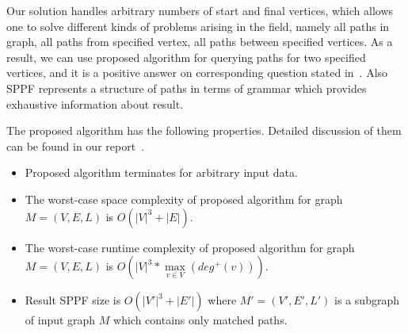 %

Our solution handles arbitrary numbers of start and final vertices, which allows one to solve different kinds of problems arising in the field, namely all paths in graph, all paths from specified vertex, all paths between specified vertices. As a result, we can use proposed algorithm for querying paths for two specified vertices, and it is a positive answer on corresponding question stated in~\cite{Hellings16}.
Also SPPF represents a structure of paths in terms of grammar which provides exhaustive information about result. 

The proposed algorithm has the following properties. Detailed discussion of them can be found in our report~\cite{GrigorevR16}.
\begin{itemize} 
\item Proposed algorithm terminates for arbitrary input data.
\item The worst-case space complexity of proposed algorithm for graph $M=(V,E,L)$ is $O(|V|^3 + |E|)$.
\item The worst-case runtime complexity of proposed algorithm for graph $M=(V,E,L)$ is $O\left(|V|^3*\max\limits_{v \in V}\left(deg^+\left(v\right)\right)\right).$
\item Result SPPF size is $O(|V'|^3 + |E'|)$ where $M'=(V',E',L')$ is a subgraph of input graph $M$ which contains only matched paths.
\end{itemize}
